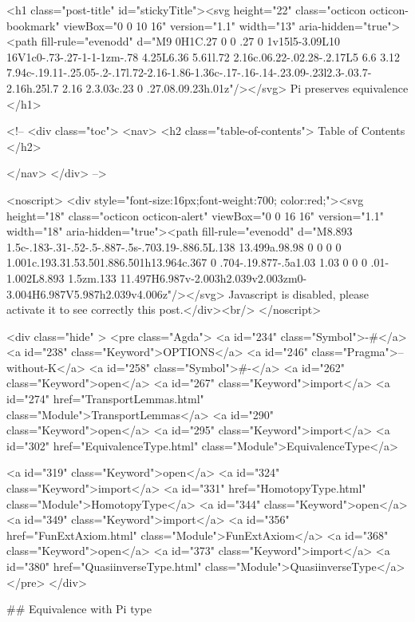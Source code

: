   <h1 class="post-title" id="stickyTitle"><svg height="22" class="octicon octicon-bookmark" viewBox="0 0 10 16" version="1.1" width="13" aria-hidden="true"><path fill-rule="evenodd" d="M9 0H1C.27 0 0 .27 0 1v15l5-3.09L10 16V1c0-.73-.27-1-1-1zm-.78 4.25L6.36 5.61l.72 2.16c.06.22-.02.28-.2.17L5 6.6 3.12 7.94c-.19.11-.25.05-.2-.17l.72-2.16-1.86-1.36c-.17-.16-.14-.23.09-.23l2.3-.03.7-2.16h.25l.7 2.16 2.3.03c.23 0 .27.08.09.23h.01z"/></svg> Pi preserves equivalence
  </h1>

  <!-- 
  <div class="toc">
    <nav>
    <h2 class="table-of-contents"> Table of Contents </h2>
      

    </nav>
  </div>
   -->

  <noscript>
  <div style="font-size:16px;font-weight:700; color:red;"><svg height="18" class="octicon octicon-alert" viewBox="0 0 16 16" version="1.1" width="18" aria-hidden="true"><path fill-rule="evenodd" d="M8.893 1.5c-.183-.31-.52-.5-.887-.5s-.703.19-.886.5L.138 13.499a.98.98 0 0 0 0 1.001c.193.31.53.501.886.501h13.964c.367 0 .704-.19.877-.5a1.03 1.03 0 0 0 .01-1.002L8.893 1.5zm.133 11.497H6.987v-2.003h2.039v2.003zm0-3.004H6.987V5.987h2.039v4.006z"/></svg> Javascript is disabled, please activate it to see correctly this post.</div><br/>
  </noscript>

  <div class="hide" >
<pre class="Agda">
<a id="234" class="Symbol">{-#</a> <a id="238" class="Keyword">OPTIONS</a> <a id="246" class="Pragma">--without-K</a> <a id="258" class="Symbol">#-}</a>
<a id="262" class="Keyword">open</a> <a id="267" class="Keyword">import</a> <a id="274" href="TransportLemmas.html" class="Module">TransportLemmas</a>
<a id="290" class="Keyword">open</a> <a id="295" class="Keyword">import</a> <a id="302" href="EquivalenceType.html" class="Module">EquivalenceType</a>

<a id="319" class="Keyword">open</a> <a id="324" class="Keyword">import</a> <a id="331" href="HomotopyType.html" class="Module">HomotopyType</a>
<a id="344" class="Keyword">open</a> <a id="349" class="Keyword">import</a> <a id="356" href="FunExtAxiom.html" class="Module">FunExtAxiom</a>
<a id="368" class="Keyword">open</a> <a id="373" class="Keyword">import</a> <a id="380" href="QuasiinverseType.html" class="Module">QuasiinverseType</a>
</pre>
</div>


## Equivalence with Pi type


